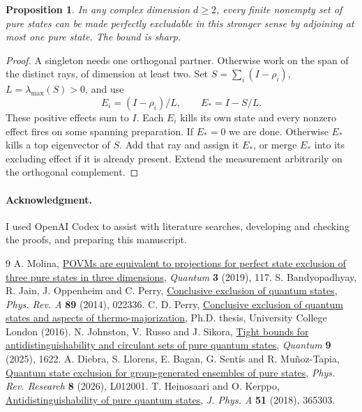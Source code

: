 \documentclass[11pt,a4paper]{article}
\newtheorem{proposition}[theorem]{Proposition}
\theoremstyle{remark}
\newcommand{\ack}{\paragraph*{Acknowledgment.} I used OpenAI Codex to assist with literature searches, developing and checking the proofs, and preparing this manuscript.}
\begin{document}
\begin{proposition}
In any complex dimension \(d\ge2\), every finite nonempty set of pure states can be made perfectly excludable in this stronger sense by adjoining at most one pure state. The bound is sharp.
\end{proposition}
\begin{proof}
A singleton needs one orthogonal partner. Otherwise work on the span of the distinct rays, of dimension at least two. Set \(S=\sum_i(I-\rho_i)\), \(L=\lambda_{\max}(S)>0\), and use
\[
                  E_i=(I-\rho_i)/L,\qquad E_*=I-S/L.
\]
These positive effects sum to \(I\). Each \(E_i\) kills its own state and every nonzero effect fires on some spanning preparation. If \(E_*=0\) we are done. Otherwise \(E_*\) kills a top eigenvector of \(S\). Add that ray and assign it \(E_*\), or merge \(E_*\) into its excluding effect if it is already present. Extend the measurement arbitrarily on the orthogonal complement.
\end{proof}

\ack
\begin{thebibliography}{9}
 A. Molina, \href{https://doi.org/10.22331/q-2019-01-25-117}{POVMs are equivalent to projections for perfect state exclusion of three pure states in three dimensions}, \emph{Quantum} \textbf{3} (2019), 117.
 S. Bandyopadhyay, R. Jain, J. Oppenheim and C. Perry, \href{https://doi.org/10.1103/PhysRevA.89.022336}{Conclusive exclusion of quantum states}, \emph{Phys. Rev. A} \textbf{89} (2014), 022336.
 C. D. Perry, \href{https://discovery.ucl.ac.uk/id/eprint/1473944/}{Conclusive exclusion of quantum states and aspects of thermo-majorization}, Ph.D. thesis, University College London (2016).
 N. Johnston, V. Russo and J. Sikora, \href{https://doi.org/10.22331/q-2025-02-04-1622}{Tight bounds for antidistinguishability and circulant sets of pure quantum states}, \emph{Quantum} \textbf{9} (2025), 1622.
 A. Diebra, S. Llorens, E. Bagan, G. Sent\'is and R. Mu\~noz-Tapia, \href{https://arxiv.org/abs/2503.02568}{Quantum state exclusion for group-generated ensembles of pure states}, \emph{Phys. Rev. Research} \textbf{8} (2026), L012001.
 T. Heinosaari and O. Kerppo, \href{https://doi.org/10.1088/1751-8121/aad1fc}{Antidistinguishability of pure quantum states}, \emph{J. Phys. A} \textbf{51} (2018), 365303.
\end{thebibliography}
\end{document}
